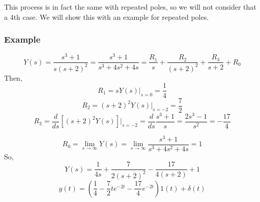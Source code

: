 \documentclass{book}
\newcommand{\exmp}{\subsubsection*{Example}}
\begin{document}
This process is in fact the same with repeated poles, so we will not consider that a 4th case. We will show this with an example for repeated poles.
\exmp
\[ Y(s)=\frac{s^3+1}{s(s+2)^2} = \frac{s^3+1}{s^3+4s^2+4s} = \frac{R_1}{s} + \frac{R_2}{(s+2)^2} + \frac{R_3}{s+2} + R_0 \]
Then,
\[ R_1 = sY(s)\Big|_{s=0} = \frac{1}{4} \]
\[ R_2 = (s+2)^2Y(s)\Big|_{s=-2} = \frac{7}{2} \]
\[ R_3 = \frac{d}{ds}\left[(s+2)^2Y(s)\right]\Big|_{s=-2} =\frac{d}{ds}\frac{s^3+1}{s} = \frac{2s^3-1}{s^2} = -\frac{17}{4} \]

\[ R_0 = \lim_{s\to\infty}Y(s) = \lim_{s\to\infty} \frac{s^3+1}{s^3+4s^2+4s} = 1 \]
So,
\[ Y(s) = \frac{1}{4s} + \frac{7}{2(s+2)^2} - \frac{17}{4(s+2)} + 1 \]
\[ y(t) = \left(\frac{1}{4} - \frac{7}{2}te^{-2t} -\frac{17}{4}e^{-2t}  \right)1(t) + \delta(t) \]
\end{document}
